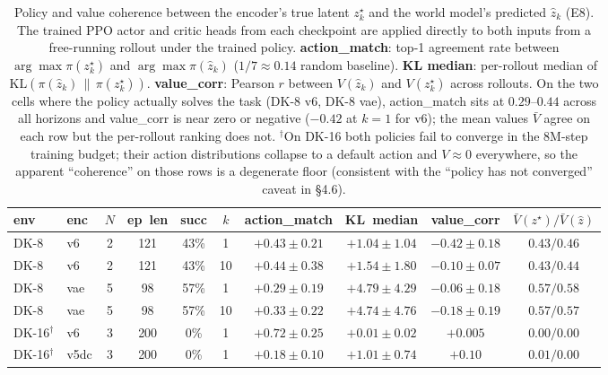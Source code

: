 \begin{table}[ht]
\centering
\small
\setlength{\tabcolsep}{4pt}
\begin{tabular}{l l c c c c c c c c}
\hline
env & enc & $N$ & ep~len & succ & $k$ & action\_match & KL~median & value\_corr & $\bar V(z^\star) / \bar V(\hat z)$ \\
\hline
DK-8  & v6  & 2 & 121 & 43\% & 1  & $+0.43\pm0.21$ & $+1.04\pm1.04$ & $\mathbf{-0.42\pm0.18}$ & $0.43 / 0.46$ \\
DK-8  & v6  & 2 & 121 & 43\% & 10 & $+0.44\pm0.38$ & $+1.54\pm1.80$ & $-0.10\pm0.07$ & $0.43 / 0.44$ \\
DK-8  & vae & 5 & 98  & 57\% & 1  & $+0.29\pm0.19$ & $+4.79\pm4.29$ & $-0.06\pm0.18$ & $0.57 / 0.58$ \\
DK-8  & vae & 5 & 98  & 57\% & 10 & $+0.33\pm0.22$ & $+4.74\pm4.76$ & $-0.18\pm0.19$ & $0.57 / 0.57$ \\
\hline
DK-16$^\dagger$ & v6   & 3 & 200 & 0\% & 1 & $+0.72\pm0.25$ & $+0.01\pm0.02$ & $+0.005$ & $0.00 / 0.00$ \\
DK-16$^\dagger$ & v5dc & 3 & 200 & 0\% & 1 & $+0.18\pm0.10$ & $+1.01\pm0.74$ & $+0.10$  & $0.01 / 0.00$ \\
\hline
\end{tabular}
\caption{Policy and value coherence between the encoder's true latent $z^\star_k$ and the world model's predicted $\hat z_k$ (E8). The trained PPO actor and critic heads from each checkpoint are applied directly to both inputs from a free-running rollout under the trained policy. \textbf{action\_match}: top-1 agreement rate between $\arg\max\pi(z^\star_k)$ and $\arg\max\pi(\hat z_k)$ ($1/7\approx 0.14$ random baseline). \textbf{KL median}: per-rollout median of $\mathrm{KL}(\pi(\hat z_k) \,\|\, \pi(z^\star_k))$. \textbf{value\_corr}: Pearson $r$ between $V(\hat z_k)$ and $V(z^\star_k)$ across rollouts. On the two cells where the policy actually solves the task (DK-8 v6, DK-8 vae), action\_match sits at $0.29$--$0.44$ across all horizons and value\_corr is near zero or negative ($-0.42$ at $k{=}1$ for v6); the mean values $\bar V$ agree on each row but the per-rollout ranking does not. $^\dagger$On DK-16 both policies fail to converge in the 8M-step training budget; their action distributions collapse to a default action and $V \approx 0$ everywhere, so the apparent ``coherence'' on those rows is a degenerate floor (consistent with the ``policy has not converged'' caveat in \S4.6).}
\label{tab:e8-coherence}
\end{table}
